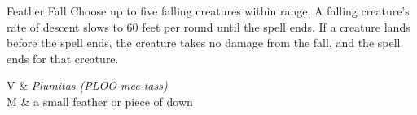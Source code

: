 \begin{Spell}[
    level=1st,
    time=1 Reaction\fmark,
    range=60 ft.,
    components={V, M},
    duration=1 Minute,
    school=Transmutation,
    attack=None,
    effect=Exploration
]{Feather Fall}
Choose up to five falling creatures within range. A falling creature's rate of descent slows to 60 feet per round until the spell ends. If a creature lands before the spell ends, the creature takes no damage from the fall, and the spell ends for that creature.


\begin{components}
V & \textit{Plumitas (PLOO-mee-tass)} \\
M & a small feather or piece of down
\end{components}
\end{Spell}


